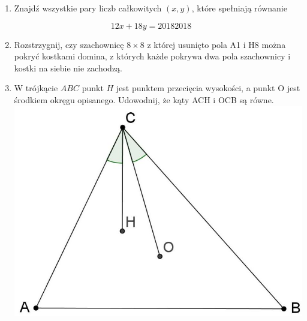 \documentclass[10pt]{article}
\begin{document}
\begin{enumerate}
  \item Znajdź wszystkie pary liczb całkowitych \((x, y)\), które spełniają równanie
\end{enumerate}

\[
12 x+18 y=20182018
\]

\begin{enumerate}
  \setcounter{enumi}{1}
  \item Rozstrzygnij, czy szachownicę \(8 \times 8\) z której usunięto pola A1 i H8 można pokryć kostkami domina, z których każde pokrywa dwa pola szachownicy i kostki na siebie nie zachodzą.
  \item W trójkącie \(A B C\) punkt \(H\) jest punktem przecięcia wysokości, a punkt O jest środkiem okręgu opisanego. Udowodnij, że kąty ACH i OCB są równe.\\
\includegraphics[max width=\textwidth, center]{2024_11_21_63b7cdbe3ba76a88bb7eg-1}
\end{enumerate}
\end{document}
